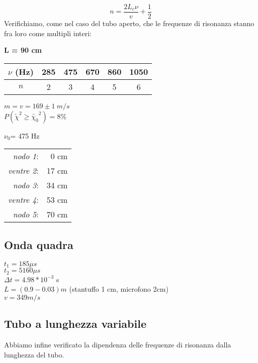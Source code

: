 $$ n = \frac{2L_c\nu}{v} + \frac{1}{2} $$
Verifichiamo, come nel caso del tubo aperto, che le frequenze di risonanza stanno fra loro come multipli interi: 

\textbf{L = 90 cm}
\\
\begin{center}
\begin{tabular}{c|c|c|c|c|c}
$\nu$ (Hz) & 285 & 475 & 670 & 860 & 1050 \\
\midrule
$n$ & 2 & 3 & 4 & 5 & 6 \\
\end{tabular}
\end{center}


\begin{center}

$m = v = 169\pm 1\ m/s$
\\

$P(\tilde{\chi}^2\geq\tilde{\chi_0}^2)=8\%$
\end{center}

\begin{center}
$\nu_0$= 475 Hz\\
\begin{tabular}{r r}
\textit{nodo 1}: & 0 cm\\
\textit{ventre 2}: & 17 cm\\
\textit{nodo 3}: & 34 cm\\
\textit{ventre 4}: & 53 cm\\
\textit{nodo 5}: & 70 cm\\
\end{tabular}
\end{center}

\subsection{Onda quadra}
$t_1 = 185 \mu s $\\
$t_2 = 5160 \mu s $\\
$\Delta t = 4.98*10^{-3}$ s\\
$L = (0.9 - 0.03) m $ (stantuffo 1 cm, microfono 2cm)\\
$v = 349 m/s$

\subsection{Tubo a lunghezza variabile}
Abbiamo infine verificato la dipendenza delle frequenze di risonanza dalla lunghezza del tubo.

